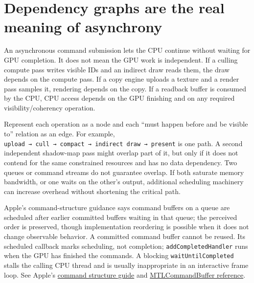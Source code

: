 \section{Dependency graphs are the real meaning of asynchrony}\label{01-foundations-i-ch011-dependency-graphs-are-the-real-meaning-of-asynchrony}

\hypertarget{01-foundations-i-ch011-dependency-graphs-are-the-real-meaning-of-asynchrony}{}

An asynchronous command submission lets the CPU continue without waiting for GPU completion. It does not mean the GPU work is independent. If a culling compute pass writes visible IDs and an indirect draw reads them, the draw depends on the compute pass. If a copy engine uploads a texture and a render pass samples it, rendering depends on the copy. If a readback buffer is consumed by the CPU, CPU access depends on the GPU finishing and on any required visibility/coherency operation.

Represent each operation as a node and each ``must happen before and be visible to'' relation as an edge. For example, \texttt{upload\ →\ cull\ →\ compact\ →\ indirect\ draw\ →\ present} is one path. A second independent shadow-map pass might overlap part of it, but only if it does not contend for the same constrained resources and has no data dependency. Two queues or command streams do not guarantee overlap. If both saturate memory bandwidth, or one waits on the other's output, additional scheduling machinery can increase overhead without shortening the critical path.

Apple's command-structure guidance says command buffers on a queue are scheduled after earlier committed buffers waiting in that queue; the perceived order is preserved, though implementation reordering is possible when it does not change observable behavior. A committed command buffer cannot be reused. Its scheduled callback marks scheduling, not completion; \texttt{addCompletedHandler} runs when the GPU has finished the commands. A blocking \texttt{waitUntilCompleted} stalls the calling CPU thread and is usually inappropriate in an interactive frame loop. See Apple's \href{https://developer.apple.com/documentation/Metal/setting-up-a-command-structure}{command structure guide} and \href{https://developer.apple.com/documentation/metal/mtlcommandbuffer}{MTLCommandBuffer reference}.

